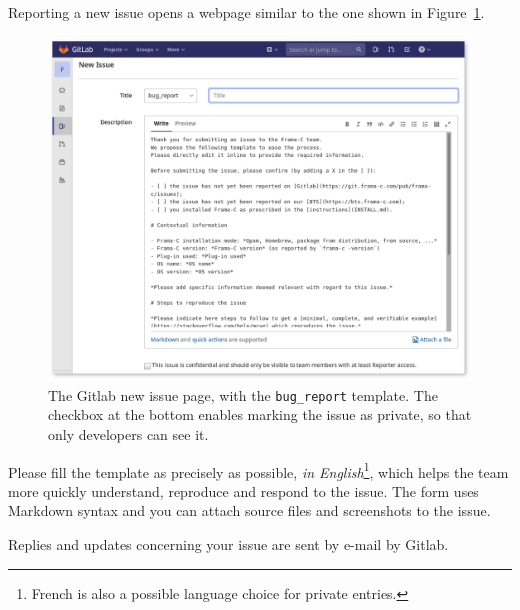 Reporting a new issue opens a webpage similar to the one shown in
Figure~\ref{fig:gitlab-bug-report}.
\begin{figure}[htbp]
\begin{center}
\includegraphics[width=\textwidth]{gitlab-bug-report.png}
\end{center}
\caption{The Gitlab new issue page, with the \texttt{bug\_report} template.
  The checkbox at the bottom enables marking the issue as private, so that
  only \FramaC developers can see it.}
\label{fig:gitlab-bug-report}
\end{figure}

Please fill the template as precisely as possible,
\emph{in English}\footnote{French is also a possible language choice for
  private entries.}, which helps the \FramaC team more quickly understand,
reproduce and respond to the issue. The form uses Markdown syntax and you can
attach source files and screenshots to the issue.

Replies and updates concerning your issue are sent by e-mail by Gitlab.

